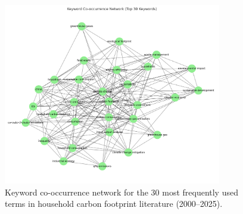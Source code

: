\documentclass[12pt,a4paper]{article}%
\begin{document}
\begin{figure}[htbp]
    \centering
    \includegraphics[width=0.85\textwidth]{keyword_cooccurrence.png}
    \caption{\small{Keyword co-occurrence network for the 30 most frequently used terms in household carbon footprint literature (2000–2025).}}
\end{figure}
\end{document}
